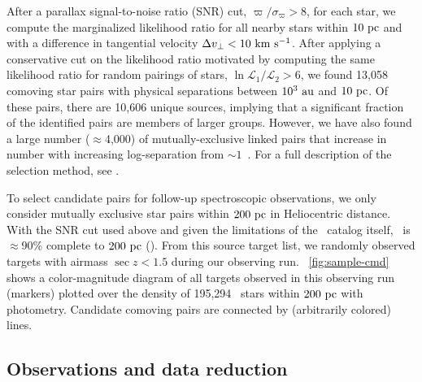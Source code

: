 \documentclass[modern, letterpaper]{aastex61}
\newcommand{\tgas}{\acronym{TGAS}}
\begin{document}
After a parallax signal-to-noise ratio (SNR) cut, $\varpi/\sigma_\varpi > 8$,
for each star, we compute the marginalized likelihood ratio for all nearby stars
within $10~\mathrm{pc}$ and with a difference in tangential velocity $\Delta v_\perp <
10~\mathrm{km}~\mathrm{s}^{-1}$.
After applying a conservative cut on the likelihood ratio motivated by computing
the same likelihood ratio for random pairings of stars, $\ln
\mathcal{L}_1/\mathcal{L}_2 > 6$, we found 13,058 comoving star pairs with
physical separations between $10^3~\mathrm{au}$ and $10~\mathrm{pc}$.
Of these pairs, there are 10,606 unique sources, implying that a significant
fraction of the identified pairs are members of larger groups.
However, we have also found a large number ($\approx$4,000) of
mutually-exclusive linked pairs that increase in number with increasing
log-separation from $\sim 1$~\pc.
For a full description of the selection method, see \citealt{Oh:2017}.

To select candidate pairs for follow-up spectroscopic observations, we only
consider mutually exclusive star pairs within $200~\mathrm{pc}$ in Heliocentric
distance.
With the SNR cut used above and given the limitations of the \tgas\ catalog
itself, \tgas\ is $\approx$90\% complete to $200~\mathrm{pc}$ (\citealt{Bovy:2017}).
From this source target list, we randomly observed targets with airmass $\sec z
< 1.5$ during our observing run.
\figurename~\ref{fig:sample-cmd} shows a color-magnitude diagram of all targets
observed in this observing run (markers) plotted over the density of 195,294
\tgas\ stars within $200~\mathrm{pc}$ with  photometry.
Candidate comoving pairs are connected by (arbitrarily colored) lines.

\subsection{Observations and data reduction}\label{sec:reduction}
\end{document}
